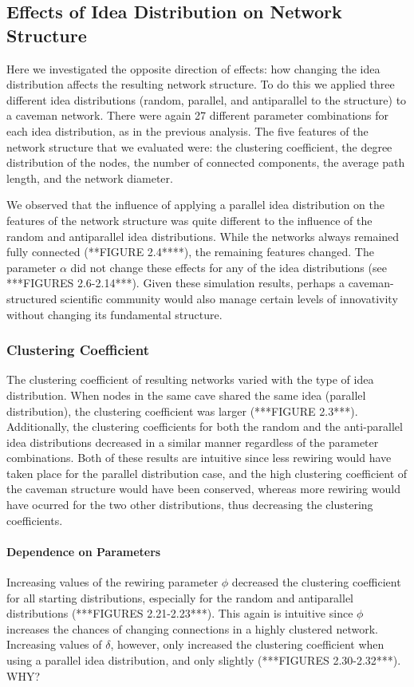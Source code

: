 \subsection{Effects of Idea Distribution on Network Structure}


Here we investigated the opposite direction of effects: how changing the idea distribution affects the resulting network structure. To do this we applied three different idea distributions (random, parallel, and antiparallel to the structure) to a caveman network. There were again 27 different parameter combinations for each idea distribution, as in the previous analysis. The five features of the network structure that we evaluated were: the clustering coefficient, the degree distribution of the nodes, the number of connected components, the average path length, and the network diameter. 

We observed that the influence of applying a parallel idea distribution on the features of the network structure was quite different to the influence of the random and antiparallel idea distributions. While the networks always remained fully connected (**FIGURE 2.4****), the remaining features changed. The parameter $\alpha$ did not change these effects for any of the idea distributions (see ***FIGURES 2.6-2.14***). Given these simulation results, perhaps a caveman-structured scientific community would also manage certain levels of innovativity without changing its fundamental structure.


\subsubsection{Clustering Coefficient}

The clustering coefficient of resulting networks varied with the type of idea distribution. When nodes in the same cave shared the same idea (parallel distribution), the clustering coefficient was larger (***FIGURE 2.3***). Additionally, the clustering coefficients for both the random and the anti-parallel idea distributions decreased in a similar manner regardless of the parameter combinations. Both of these results are intuitive since less rewiring would have taken place for the parallel distribution case, and the high clustering coefficient of the caveman structure would have been conserved, whereas more rewiring would have ocurred for the two other distributions, thus decreasing the clustering coefficients.

\paragraph{Dependence on Parameters}
Increasing values of the rewiring parameter $\phi$ decreased the clustering coefficient for all starting distributions, especially for the random and antiparallel distributions (***FIGURES 2.21-2.23***). This again is intuitive since $\phi$ increases the chances of changing connections in a highly clustered network.
Increasing values of $\delta$, however, only increased the clustering coefficient when using a parallel idea distribution, and only slightly (***FIGURES 2.30-2.32***). WHY?

